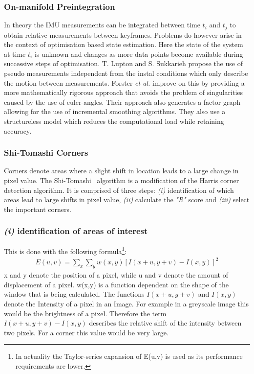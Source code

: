 \documentclass[11pt,a4paper]{article}
\begin{document}
\subsubsection{On-manifold Preintegration} \label{pre:on-manifold}
In theory the IMU measurements can be integrated between time $t_i$ and $t_j$ to obtain relative measurements between keyframes.
Problems do however arise in the context of optimisation based state estimation. 
Here the state of the system at time $t_i$ is unknown and changes as more data points become available during successive steps of optimisation.
T. Lupton and S. Sukkarieh \cite{preint_lupton} propose the use of pseudo measurements independent from the instal conditions which only describe the motion between measurements.
Forster \textit{et al.} \cite{Forster_2017} improve on this by providing a more mathematically rigorous approach that avoids the problem of singularities caused by the use of euler-angles. 
Their approach also generates a factor graph allowing for the use of incremental smoothing algorithms. 
They also use a structureless model which reduces the computational load while retaining accuracy.

\subsubsection{Shi-Tomashi Corners} \label{Sec:Shi-Tomashi}
Corners denote areas where a slight shift in location leads to a large change in pixel value. 
The Shi-Tomashi~\cite{Shi_tomasi} algorithm is a modification of the Harris corner detection algorithm. 
It is comprised of three steps: \emph{(i)} identification of which areas lead to large shifts in pixel value, \emph{(ii)} calculate the \textit{"R"} score and \emph{(iii)} select the important corners.
\subsubsection*{\emph{(i)} identification of areas of interest} 

This is done with the following formula\footnote{In actuality the Taylor-series expansion of E(u,v) is used as its performance requirements are lower.}:
\begin{align}
    E(u,v) = \sum_{x} \sum_y w(x,y) [I(x+u,y+v)- I(x,y)]^2  
\end{align}
x and y denote the position of a pixel, while u and v denote the amount of displacement of a pixel.
w(x,y) is a function dependent on the shape of the window that is being calculated. 
The functions $I(x+u,y+v)$ and $I(x,y)$ denote the Intensity of a pixel in an Image.
For example in a greyscale image this would be the brightness of a pixel.
Therefore the term $I(x+u,y+v)- I(x,y)$ describes the relative shift of the intensity between two pixels. For a corner this value would be very large.
\end{document}
